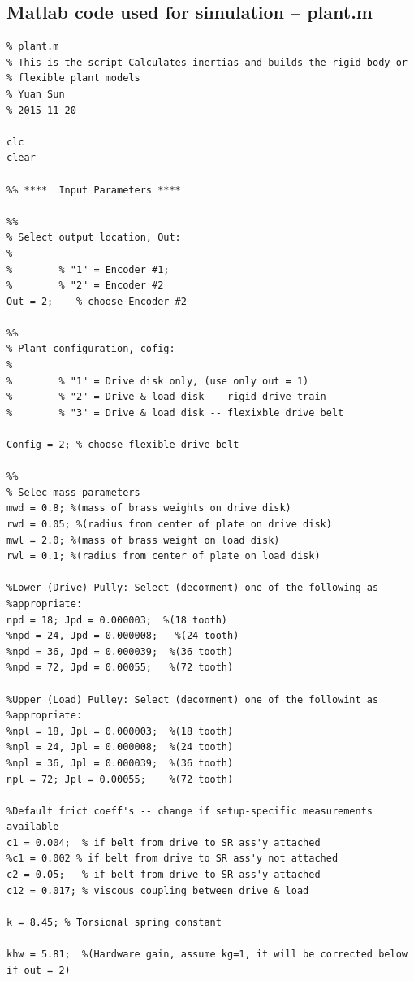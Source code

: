 \documentclass[a4paper, 12pt]{article}
\begin{document}
\newpage
\addappheadtotoc
\appendixpage
\begin{appendices}

\section{Matlab code used for simulation -- plant.m}
\begin{verbatim}
% plant.m
% This is the script Calculates inertias and builds the rigid body or
% flexible plant models
% Yuan Sun
% 2015-11-20

clc
clear

%% ****  Input Parameters ****

%%
% Select output location, Out:
%
%        % "1" = Encoder #1; 
%        % "2" = Encoder #2
Out = 2;    % choose Encoder #2

%%
% Plant configuration, cofig:
%
%        % "1" = Drive disk only, (use only out = 1)
%        % "2" = Drive & load disk -- rigid drive train
%        % "3" = Drive & load disk -- flexixble drive belt

Config = 2; % choose flexible drive belt

%%
% Selec mass parameters
mwd = 0.8; %(mass of brass weights on drive disk)
rwd = 0.05; %(radius from center of plate on drive disk)
mwl = 2.0; %(mass of brass weight on load disk)
rwl = 0.1; %(radius from center of plate on load disk)

%Lower (Drive) Pully: Select (decomment) one of the following as
%appropriate:
npd = 18; Jpd = 0.000003;  %(18 tooth)
%npd = 24, Jpd = 0.000008;   %(24 tooth)
%npd = 36, Jpd = 0.000039;  %(36 tooth)
%npd = 72, Jpd = 0.00055;   %(72 tooth)

%Upper (Load) Pulley: Select (decomment) one of the followint as
%appropriate:
%npl = 18, Jpl = 0.000003;  %(18 tooth)
%npl = 24, Jpl = 0.000008;  %(24 tooth)
%npl = 36, Jpl = 0.000039;  %(36 tooth)
npl = 72; Jpl = 0.00055;    %(72 tooth)

%Default frict coeff's -- change if setup-specific measurements available
c1 = 0.004;  % if belt from drive to SR ass'y attached
%c1 = 0.002 % if belt from drive to SR ass'y not attached
c2 = 0.05;   % if belt from drive to SR ass'y attached
c12 = 0.017; % viscous coupling between drive & load

k = 8.45; % Torsional spring constant

khw = 5.81;  %(Hardware gain, assume kg=1, it will be corrected below if out = 2)



\end{verbatim}
\end{appendices}
\end{document}
